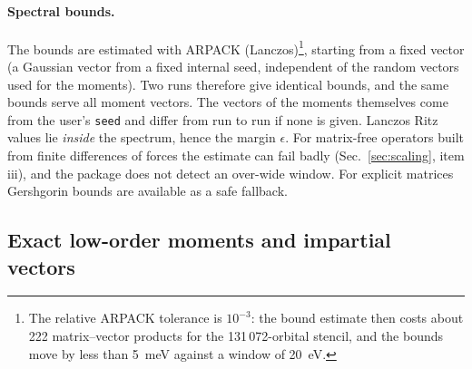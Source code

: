\documentclass[reprint,nofootinbib,superscriptaddress,amsmath,amssymb,aps,prb,floatfix]{revtex4-2}
\begin{document}
\paragraph*{Spectral bounds.}
The bounds are estimated with ARPACK (Lanczos)\footnote{The relative ARPACK tolerance is $10^{-3}$: the bound estimate then costs about 222 matrix--vector products for the 131\,072-orbital stencil, and the bounds move by less than 5~meV against a window of 20~eV.}, starting from a fixed vector (a Gaussian vector from a fixed internal seed, independent of the random vectors used for the moments). Two runs therefore give identical bounds, and the same bounds serve all moment vectors. The vectors of the moments themselves come from the user's \texttt{seed} and differ from run to run if none is given. Lanczos Ritz values lie \emph{inside} the spectrum, hence the margin $\epsilon$. For matrix-free operators built from finite differences of forces the estimate can fail badly (Sec.~\ref{sec:scaling}, item iii), and the package does not detect an over-wide window.
For explicit matrices Gershgorin bounds are available as a safe fallback.

\subsection{Exact low-order moments and impartial vectors}
\label{sec:exact}
\end{document}

